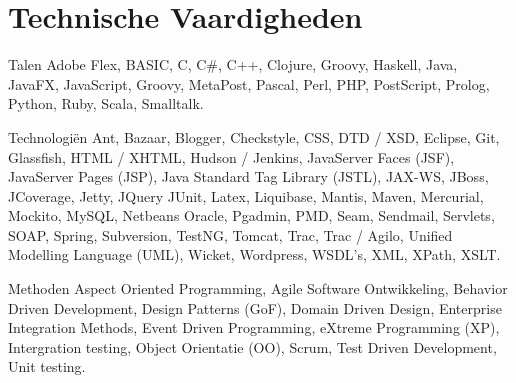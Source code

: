 \section*{Technische Vaardigheden}

	\begin{skillList}
		\item[Talen] Adobe Flex, BASIC, C, C\#, C++, Clojure, Groovy, Haskell, 
		Java, JavaFX, JavaScript, Groovy, MetaPost, Pascal, Perl, PHP, PostScript, 
		Prolog, Python, Ruby, Scala, Smalltalk.\hfill\\
		
		\item[Technologi\"en] Ant, Bazaar, Blogger, Checkstyle, CSS, DTD / XSD, 
		Eclipse, Git, Glassfish, HTML / XHTML, Hudson / Jenkins, 
		JavaServer Faces (JSF), JavaServer Pages (JSP), 
		Java Standard Tag Library (JSTL), JAX-WS, JBoss, JCoverage, Jetty, JQuery
		JUnit, Latex, Liquibase, Mantis, Maven, Mercurial, Mockito, MySQL, Netbeans
		Oracle, Pgadmin, PMD, Seam, Sendmail, Servlets, SOAP, Spring, Subversion,
		TestNG, Tomcat, Trac, Trac / Agilo, Unified Modelling Language (UML),
		Wicket, Wordpress, WSDL's, XML, XPath, XSLT.\hfill\\
		
		\item[Methoden] Aspect Oriented Programming, Agile Software Ontwikkeling,
		Behavior Driven Development, Design Patterns (GoF), Domain Driven Design, 
		Enterprise Integration Methods, Event Driven Programming, 
		eXtreme Programming (XP), Intergration testing, Object Orientatie (OO), 
		Scrum, Test Driven Development, Unit testing.\hfill\\
		
	\end{skillList}
